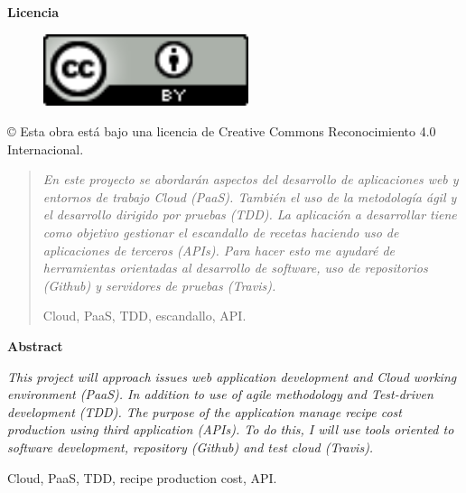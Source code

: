 \documentclass[spanish,a4paper,twoside]{report}
\newenvironment{summary}
{\par\noindent\begin{center}\textbf{Abstract}\end{center}\begin{itshape}\par\noindent}
{\end{itshape}}
\newenvironment{keywords}
{\begin{list}{}{\setlength{\leftmargin}{1em}}\item[\hskip\labelsep \bfseries Keywords:]}
{\end{list}}
\newenvironment{palabrasClave}
{\begin{list}{}{\setlength{\leftmargin}{1em}}\item[\hskip\labelsep \bfseries Palabras clave:]}
{\end{list}}
\begin{document}
\newpage
{
\begin{center}
  \textbf{{\huge Licencia}}

  \vspace*{0.2in}
  \begin{figure}[htb]
    \begin{center}
      \includegraphics[width=6cm]{./images/logotipo-licencia.png}
    \end{center}
  \end{figure}
  
  \vspace*{0.2in}
  \begin{Large}
    © Esta obra está bajo una licencia de Creative Commons Reconocimiento 4.0 Internacional.
  \end{Large}
\end{center}
}


\newpage
\begin{abstract}
{\em 
En este proyecto se abordarán aspectos del desarrollo de aplicaciones web y entornos de trabajo Cloud (PaaS). También el uso de la metodología ágil y el desarrollo dirigido por pruebas (TDD). La aplicación a desarrollar tiene como objetivo gestionar el escandallo de recetas haciendo uso de aplicaciones de terceros (APIs). Para hacer esto me ayudaré de herramientas orientadas al desarrollo de software, uso de repositorios (Github) y servidores de pruebas (Travis).
}

\vspace*{0.2in}
\begin{palabrasClave}
  Cloud, PaaS, TDD, escandallo, API.
\end{palabrasClave}

\end{abstract}

\newpage
\begin{summary}
{\em 
This project will approach issues web application development and Cloud working environment (PaaS). In addition to use of agile methodology and Test-driven development (TDD). The purpose of the application manage recipe cost production using third application (APIs). To do this, I will use tools oriented to software development, repository (Github) and test cloud (Travis).
}

\vspace*{0.2in}
\begin{keywords}
  Cloud, PaaS, TDD, recipe production cost, API.
\end{keywords}

\end{summary}
\end{document}
